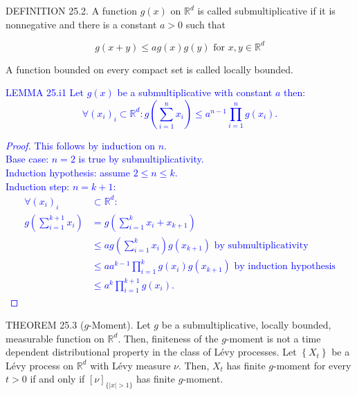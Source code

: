\documentclass[a4paper,11pt]{article}
\begin{document}
DEFINITION 25.2. A function $g(x)$ on $\mathbb{R}^{d}$ is called submultiplicative if it is nonnegative
and there is a constant $a>0$ such that

\begin{equation*}
    g(x+y) \leq a g(x) g(y) \text { for } x, y \in \mathbb{R}^{d} \tag{25.1}
\end{equation*}

\noindent A function bounded on every compact set is called locally bounded. \\


\textcolor{blue}{
    LEMMA 25.i1 Let $g(x)$ be a submultiplicative with constant $a$ then:
    $$
        \forall (x_{i})_{i} \subset \mathbb{R}^d:
        g\left(\sum_{i=1}^{n} x_{i}\right) \le a^{n-1} \prod_{i=1}^{n} g(x_{i})  .
    $$
    \begin{proof}
        This follows by induction on $n$. \\
        Base case: $n=2$ is true by submultiplicativity. \\
        Induction hypothesis: assume $2 \le  n \le k$. \\
        Induction step: $n=k+1$:
        \begin{align*}
            \forall (x_{i})_{i}                  & \subset \mathbb{R}^d:                                                                          \\
            g\left(\sum_{i=1}^{k+1} x_{i}\right) & = g\left(\sum_{i=1}^{k} x_{i} + x_{k+1}\right)                                                 \\
                                                 & \le a g\left(\sum_{i=1}^{k} x_{i}\right) g(x_{k+1})  \text{ by submultiplicativity}            \\
                                                 & \le a a^{k-1} \prod_{i=1}^{k}  g\left(x_{i}\right) g(x_{k+1})  \text{ by induction hypothesis} \\
                                                 & \le a^{k} \prod_{i=1}^{k+1}  g\left(x_{i}\right) .
        \end{align*}
    \end{proof}
}

THEOREM 25.3 ($g$-Moment). Let $g$ be a submultiplicative, locally bounded, measurable
function on $\mathbb{R}^{d}$. Then, finiteness of the $g$-moment is not a time dependent
distributional property in the class of Lévy processes. Let $\left\{X_{t}\right\}$ be a Lévy process
on $\mathbb{R}^{d}$ with Lévy measure $\nu$. Then, $X_{t}$ has finite $g$-moment for every $t>0$ if
and only if $[\nu]_{\{|x|>1\}}$ has finite $g$-moment. \\
\end{document}
